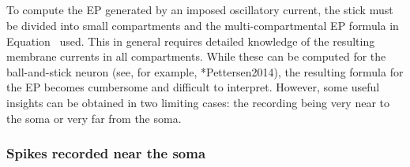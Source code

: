 \subsection{}
\label{Spikes:sec:approximate}

To compute the EP generated by an imposed oscillatory current, the stick must be divided into small compartments  
and the multi-compartmental EP formula in Equation~ used. 
This in general requires detailed knowledge of the resulting membrane currents in all compartments. 
While these can be computed for the ball-and-stick neuron (see, for example, \citeasnoun**{Pettersen2014}), 
the resulting formula for the EP becomes cumbersome and difficult to interpret.  
However, some useful insights can be obtained in two limiting cases: the recording being very near to the soma 
or very far from the soma.

%

\subsubsection{Spikes recorded near the soma}
\label{Spikes:sec:near-spikes}

